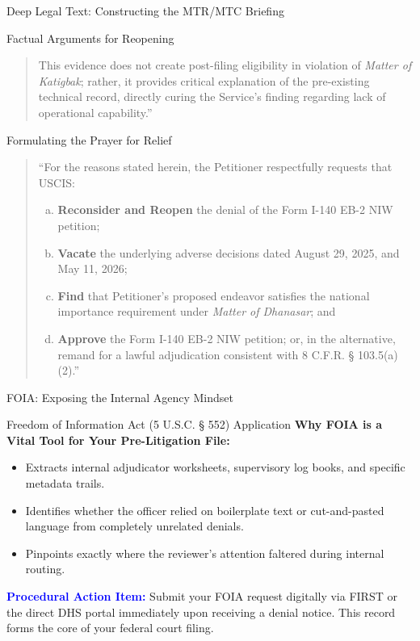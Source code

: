 \documentclass[11pt]{beamer}
\begin{document}
\begin{frame}[allowframebreaks]{Deep Legal Text: Constructing the MTR/MTC Briefing}
\begin{block}{Factual Arguments for Reopening}
\begin{quote}
				This evidence does not create post-filing eligibility in violation of \textit{Matter of Katigbak}; rather, it provides critical explanation of the pre-existing technical record, directly curing the Service's finding regarding lack of operational capability.''
			\end{quote}
		\end{block}
		\framebreak
		\begin{block}{Formulating the Prayer for Relief}
			\begin{quote}
				``For the reasons stated herein, the Petitioner respectfully requests that USCIS:
				\begin{enumerate}[(a)]
					\item \textbf{Reconsider and Reopen} the denial of the Form I-140 EB-2 NIW petition;
					\item \textbf{Vacate} the underlying adverse decisions dated August 29, 2025, and May 11, 2026;
					\item \textbf{Find} that Petitioner's proposed endeavor satisfies the national importance requirement under \textit{Matter of Dhanasar}; and
					\item \textbf{Approve} the Form I-140 EB-2 NIW petition; or, in the alternative, remand for a lawful adjudication consistent with 8 C.F.R. § 103.5(a)(2).''
				\end{enumerate}
			\end{quote}
		\end{block}
	\end{frame}
	
	
	\begin{frame}{FOIA: Exposing the Internal Agency Mindset}
		\scriptsize
		\begin{block}{Freedom of Information Act (5 U.S.C. § 552) Application}
			\textbf{Why FOIA is a Vital Tool for Your Pre-Litigation File:}
			\begin{itemize}
				\item Extracts internal adjudicator worksheets, supervisory log books, and specific metadata trails.
				\item Identifies whether the officer relied on boilerplate text or cut-and-pasted language from completely unrelated denials.
				\item Pinpoints exactly where the reviewer's attention faltered during internal routing.
			\end{itemize}
			\textcolor{blue}{\textbf{Procedural Action Item:}} Submit your FOIA request digitally via FIRST or the direct DHS portal immediately upon receiving a denial notice. This record forms the core of your federal court filing.
		\end{block}
	\end{frame}
	
\end{document}
